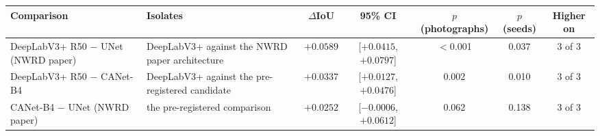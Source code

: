 \begin{tabular}{llccccc}
\toprule
Comparison & Isolates & $\Delta$IoU & 95\% CI & $p$ (photographs) & $p$ (seeds) & Higher on \\
\midrule
DeepLabV3+ R50 $-$ UNet (NWRD paper) & DeepLabV3+ against the NWRD paper architecture & $+0.0589$ & [$+0.0415$, $+0.0797$] & $<$0.001 & 0.037 & 3 of 3 \\
DeepLabV3+ R50 $-$ CANet-B4 & DeepLabV3+ against the pre-registered candidate & $+0.0337$ & [$+0.0127$, $+0.0476$] & 0.002 & 0.010 & 3 of 3 \\
CANet-B4 $-$ UNet (NWRD paper) & the pre-registered comparison & $+0.0252$ & [$-0.0006$, $+0.0612$] & 0.062 & 0.138 & 3 of 3 \\
\bottomrule
\end{tabular}
